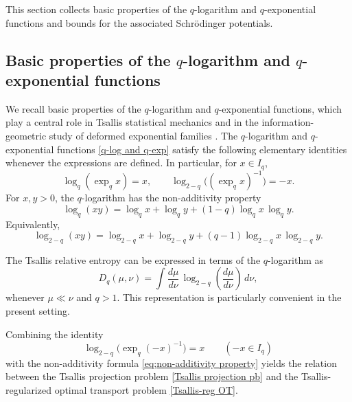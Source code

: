 \documentclass[a4paper,11pt]{article}
\theoremstyle{plain}
\theoremstyle{definition}
\theoremstyle{remark}
\theoremstyle{plain}
\numberwithin{equation}{section}
\newcommand{\1}{\mbox{1}\hspace{-0.25em}\mbox{l}} %
\begin{document}
This section collects basic properties of the $q$-logarithm and $q$-exponential functions and bounds for the associated Schr\"odinger potentials.

\subsection{Basic properties of the $q$-logarithm and $q$-exponential functions}
We recall basic properties of the $q$-logarithm and $q$-exponential functions, which play a central role in Tsallis statistical mechanics \cite{Naudts2011, tsallisbook2009} and in the information-geometric study of deformed exponential families \cite{AmariOhara2011}. The $q$-logarithm and $q$-exponential functions \eqref{q-log and q-exp} satisfy the following elementary identities whenever the expressions are defined. In particular, for $x\in I_q$,
\begin{equation*}
\log_q(\exp_q x)=x,\qquad \log_{2-q}\bigl((\exp_q x)^{-1}\bigr)=-x.
\end{equation*}
For $x,y>0$, the $q$-logarithm has the non-additivity property
\begin{equation*}
\log_q(xy)
= \log_q x+\log_q y+(1-q)\log_q x\,\log_q y.
\end{equation*}
Equivalently,
\begin{equation}\label{eq;non-additivity property}
\log_{2-q}(xy) = \log_{2-q}x+\log_{2-q}y+(q-1)\log_{2-q}x\,\log_{2-q}y.
\end{equation}

The Tsallis relative entropy can be expressed in terms of the $q$-logarithm as
\begin{equation*}
D_q(\mu,\nu)
=
\int \frac{d\mu}{d\nu}\,\log_{2-q}\!\left(\frac{d\mu}{d\nu}\right)\,d\nu,
\end{equation*}
whenever $\mu\ll \nu$ and $q>1$. This representation is particularly convenient in the present setting.

Combining the identity
\begin{equation*}
\log_{2-q}\bigl(\exp_q(-x)^{-1}\bigr)=x
\qquad (-x\in I_q)
\end{equation*}
with the non-additivity formula \eqref{eq;non-additivity property} yields the relation between the Tsallis projection problem \eqref{Tsallis projection pb} and the Tsallis-regularized optimal transport problem \eqref{Tsallis-reg OT}.
\end{document}

